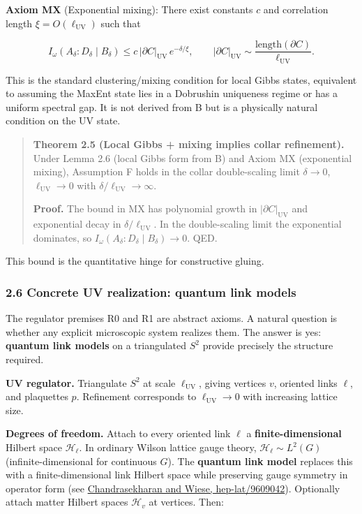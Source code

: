 \documentclass[
]{article}
\begin{document}
\textbf{Axiom MX} (Exponential mixing): There exist constants \(c\) and
correlation length \(\xi = O(\ell_{\mathrm{UV}})\) such that

\[
I_\omega(A_\delta:D_\delta \mid B_\delta) \le
c\,\lvert\partial C\rvert_{\mathrm{UV}}\,e^{-\delta/\xi},
\qquad
\lvert\partial C\rvert_{\mathrm{UV}} \sim \frac{\mathrm{length}(\partial C)}{\ell_{\mathrm{UV}}}.
\]

This is the standard clustering/mixing condition for local Gibbs states,
equivalent to assuming the MaxEnt state lies in a Dobrushin uniqueness
regime or has a uniform spectral gap. It is not derived from B but is a
physically natural condition on the UV state.

\begin{quote}
\textbf{Theorem 2.5 (Local Gibbs + mixing implies collar refinement).}
Under Lemma 2.6 (local Gibbs form from B) and Axiom MX (exponential
mixing), Assumption F holds in the collar double-scaling limit
\(\delta \to 0\), \(\ell_{\mathrm{UV}} \to 0\) with
\(\delta/\ell_{\mathrm{UV}} \to \infty\).

\textbf{Proof.} The bound in MX has polynomial growth in
\(\lvert\partial C\rvert_{\mathrm{UV}}\) and exponential decay in
\(\delta/\ell_{\mathrm{UV}}\). In the double-scaling limit the
exponential dominates, so
\(I_\omega(A_\delta:D_\delta \mid B_\delta) \to 0\). QED.
\end{quote}

This bound is the quantitative hinge for constructive gluing.

\subsubsection{2.6 Concrete UV realization: quantum link
models}\label{concrete-uv-realization-quantum-link-models}

The regulator premises R0 and R1 are abstract axioms. A natural question
is whether any explicit microscopic system realizes them. The answer is
yes: \textbf{quantum link models} on a triangulated \(S^2\) provide
precisely the structure required.

\textbf{UV regulator.} Triangulate \(S^2\) at scale
\(\ell_{\mathrm{UV}}\), giving vertices \(v\), oriented links \(\ell\),
and plaquettes \(p\). Refinement corresponds to
\(\ell_{\mathrm{UV}} \to 0\) with increasing lattice size.

\textbf{Degrees of freedom.} Attach to every oriented link \(\ell\) a
\textbf{finite-dimensional} Hilbert space \(\mathcal{H}_\ell\). In
ordinary Wilson lattice gauge theory, \(\mathcal{H}_\ell \sim L^2(G)\)
(infinite-dimensional for continuous \(G\)). The \textbf{quantum link
model} replaces this with a finite-dimensional link Hilbert space while
preserving gauge symmetry in operator form (see
\href{https://arxiv.org/abs/hep-lat/9609042}{Chandrasekharan and Wiese,
hep-lat/9609042}). Optionally attach matter Hilbert spaces
\(\mathcal{H}_v\) at vertices. Then:
\end{document}
